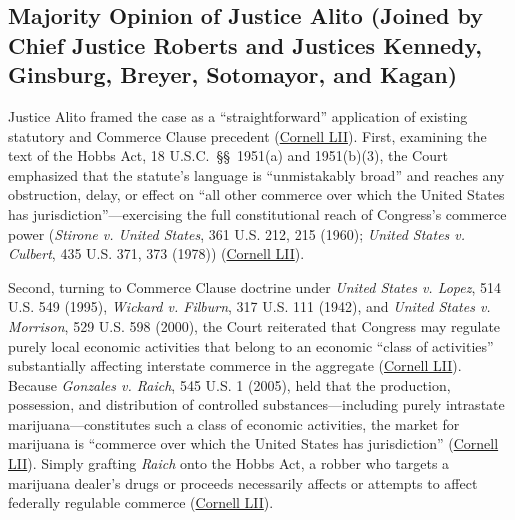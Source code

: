 \documentclass[12pt]{article}
\begin{document}
\subsection{Majority Opinion of Justice Alito (Joined by Chief Justice Roberts and Justices Kennedy, Ginsburg, Breyer, Sotomayor, and Kagan)}
Justice Alito framed the case as a ``straightforward'' application of existing statutory and Commerce Clause precedent (\href{https://www.law.cornell.edu/supremecourt/text/14-6166}{Cornell LII}). First, examining the text of the Hobbs Act, 18 U.S.C.\ \S\S~1951(a) and 1951(b)(3), the Court emphasized that the statute's language is ``unmistakably broad'' and reaches any obstruction, delay, or effect on ``all other commerce over which the United States has jurisdiction''---exercising the full constitutional reach of Congress's commerce power (\textit{Stirone v. United States}, 361 U.S. 212, 215 (1960); \textit{United States v. Culbert}, 435 U.S. 371, 373 (1978)) (\href{https://www.law.cornell.edu/supremecourt/text/14-6166}{Cornell LII}).

Second, turning to Commerce Clause doctrine under \textit{United States v. Lopez}, 514 U.S. 549 (1995), \textit{Wickard v. Filburn}, 317 U.S. 111 (1942), and \textit{United States v. Morrison}, 529 U.S. 598 (2000), the Court reiterated that Congress may regulate purely local economic activities that belong to an economic ``class of activities'' substantially affecting interstate commerce in the aggregate (\href{https://www.law.cornell.edu/supremecourt/text/14-6166}{Cornell LII}). Because \textit{Gonzales v. Raich}, 545 U.S. 1 (2005), held that the production, possession, and distribution of controlled substances---including purely intrastate marijuana---constitutes such a class of economic activities, the market for marijuana is ``commerce over which the United States has jurisdiction'' (\href{https://www.law.cornell.edu/supremecourt/text/14-6166}{Cornell LII}). Simply grafting \textit{Raich} onto the Hobbs Act, a robber who targets a marijuana dealer's drugs or proceeds necessarily affects or attempts to affect federally regulable commerce (\href{https://www.law.cornell.edu/supremecourt/text/14-6166}{Cornell LII}).
\end{document}
